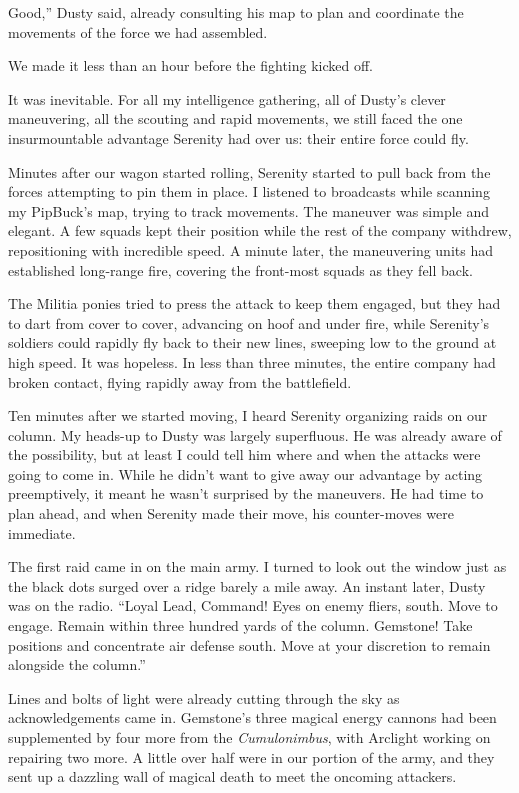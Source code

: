 \leavevmode{}Good,” Dusty said, already consulting his map to plan and coordinate the movements of the force we had assembled.

{\br}%
We made it less than an hour before the fighting kicked off.

It was inevitable. For all my intelligence gathering, all of Dusty’s clever maneuvering, all the scouting and rapid movements, we still faced the one insurmountable advantage Serenity had over us: their entire force could fly.

Minutes after our wagon started rolling, Serenity started to pull back from the forces attempting to pin them in place. I listened to broadcasts while scanning my PipBuck’s map, trying to track movements. The maneuver was simple and elegant. A few squads kept their position while the rest of the company withdrew, repositioning with incredible speed. A minute later, the maneuvering units had established long-range fire, covering the front-most squads as they fell back.

The Militia ponies tried to press the attack to keep them engaged, but they had to dart from cover to cover, advancing on hoof and under fire, while Serenity’s soldiers could rapidly fly back to their new lines, sweeping low to the ground at high speed. It was hopeless. In less than three minutes, the entire company had broken contact, flying rapidly away from the battlefield.

Ten minutes after we started moving, I heard Serenity organizing raids on our column. My heads-up to Dusty was largely superfluous. He was already aware of the possibility, but at least I could tell him where and when the attacks were going to come in. While he didn’t want to give away our advantage by acting preemptively, it meant he wasn’t surprised by the maneuvers. He had time to plan ahead, and when Serenity made their move, his counter-moves were immediate.

The first raid came in on the main army. I turned to look out the window just as the black dots surged over a ridge barely a mile away. An instant later, Dusty was on the radio. “Loyal Lead, Command! Eyes on enemy fliers, south. Move to engage. Remain within three hundred yards of the column. Gemstone! Take positions and concentrate air defense south. Move at your discretion to remain alongside the column.”

Lines and bolts of light were already cutting through the sky as acknowledgements came in. Gemstone’s three magical energy cannons had been supplemented by four more from the \textit{Cumulonimbus}, with Arclight working on repairing two more. A little over half were in our portion of the army, and they sent up a dazzling wall of magical death to meet the oncoming attackers.


